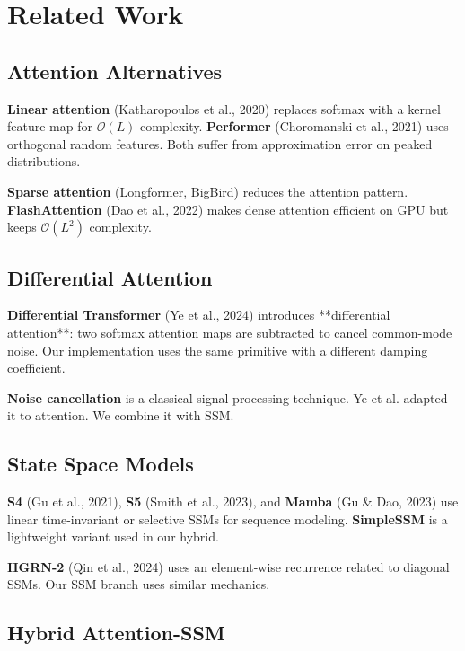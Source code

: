 \section{Related Work}

\subsection{Attention Alternatives}

\textbf{Linear attention} (Katharopoulos et al., 2020) replaces softmax with a 
kernel feature map for $\mathcal{O}(L)$ complexity. \textbf{Performer} 
(Choromanski et al., 2021) uses orthogonal random features. Both suffer 
from approximation error on peaked distributions.

\textbf{Sparse attention} (Longformer, BigBird) reduces the attention pattern. 
\textbf{FlashAttention} (Dao et al., 2022) makes dense attention efficient on 
GPU but keeps $\mathcal{O}(L^2)$ complexity.

\subsection{Differential Attention}

\textbf{Differential Transformer} (Ye et al., 2024) introduces **differential 
attention**: two softmax attention maps are subtracted to cancel 
common-mode noise. Our implementation uses the same primitive with a 
different damping coefficient.

\textbf{Noise cancellation} is a classical signal processing technique. Ye et al. 
adapted it to attention. We combine it with SSM.

\subsection{State Space Models}

\textbf{S4} (Gu et al., 2021), \textbf{S5} (Smith et al., 2023), and \textbf{Mamba} (Gu \& 
Dao, 2023) use linear time-invariant or selective SSMs for sequence 
modeling. \textbf{SimpleSSM} is a lightweight variant used in our hybrid.

\textbf{HGRN-2} (Qin et al., 2024) uses an element-wise recurrence related to 
diagonal SSMs. Our SSM branch uses similar mechanics.

\subsection{Hybrid Attention-SSM}

